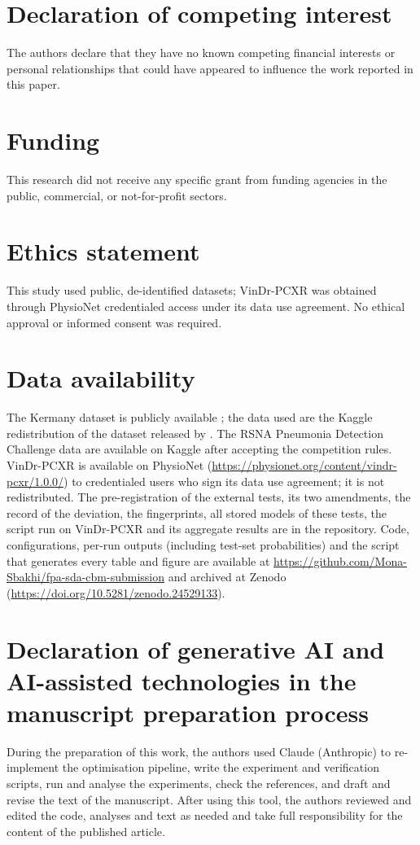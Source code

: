 \documentclass[preprint,12pt]{elsarticle}
\begin{document}
\section*{Declaration of competing interest}
The authors declare that they have no known competing financial interests or personal relationships that could have appeared to influence the work reported in this paper.

\section*{Funding}
This research did not receive any specific grant from funding agencies in the public, commercial, or not-for-profit sectors.

\section*{Ethics statement}
This study used public, de-identified datasets; VinDr-PCXR was obtained through PhysioNet credentialed access under its data use agreement. No ethical approval or informed consent was required.

\section*{Data availability}
The Kermany dataset is publicly available \citep{kaggle2018cxr,kermany2018}; the data used are the Kaggle redistribution of the dataset released by \citet{kermany2018}. The RSNA Pneumonia Detection Challenge data \citep{shih2019rsna} are available on Kaggle after accepting the competition rules. VinDr-PCXR \citep{pham2023pedicxr} is available on PhysioNet (\url{https://physionet.org/content/vindr-pcxr/1.0.0/}) to credentialed users who sign its data use agreement; it is not redistributed. The pre-registration of the external tests, its two amendments, the record of the deviation, the fingerprints, all stored models of these tests, the script run on VinDr-PCXR and its aggregate results are in the repository. Code, configurations, per-run outputs (including test-set probabilities) and the script that generates every table and figure are available at \url{https://github.com/Mona-Sbakhi/fpa-sda-cbm-submission} and archived at Zenodo (\url{https://doi.org/10.5281/zenodo.24529133}).

\section*{Declaration of generative AI and AI-assisted technologies in the manuscript preparation process}
During the preparation of this work, the authors used Claude (Anthropic) to re-implement the optimisation pipeline, write the experiment and verification scripts, run and analyse the experiments, check the references, and draft and revise the text of the manuscript. After using this tool, the authors reviewed and edited the code, analyses and text as needed and take full responsibility for the content of the published article.
\end{document}
